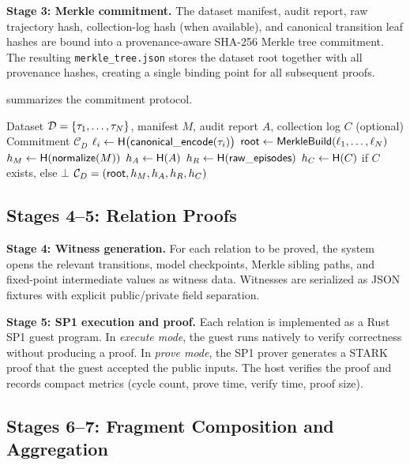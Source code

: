 \textbf{Stage 3: Merkle commitment.} The dataset manifest, audit report, raw
trajectory hash, collection-log hash (when available), and canonical transition
leaf hashes are bound into a provenance-aware SHA-256 Merkle tree commitment.
The resulting \texttt{merkle\_tree.json} stores the dataset root together with
all provenance hashes, creating a single binding point for all subsequent proofs.

 summarizes the commitment protocol.

\begin{algorithm}[!t]
\caption{Provenance-Bound Dataset Commitment}
\label{alg:dataset-commitment}
\begin{algorithmic}[1]
\Require Dataset $\mathcal{D} = \{\tau_1, \ldots, \tau_N\}$, manifest $M$,
  audit report $A$, collection log $C$ (optional)
\Ensure Commitment $\mathcal{C}_D$
  \State $\ell_i \gets \mathsf{H}\bigl(\mathsf{canonical\_encode}(\tau_i)\bigr)$
\EndFor
\State $\mathsf{root} \gets \mathsf{MerkleBuild}(\ell_1, \ldots, \ell_N)$
\State $h_M \gets \mathsf{H}(\mathsf{normalize}(M))$
\State $h_A \gets \mathsf{H}(A)$
\State $h_R \gets \mathsf{H}(\mathsf{raw\_episodes})$
\State $h_C \gets \mathsf{H}(C)$ if $C$ exists, else $\bot$
\State \Return $\mathcal{C}_D = (\mathsf{root}, h_M, h_A, h_R, h_C)$
\end{algorithmic}
\end{algorithm}

\subsection{Stages 4--5: Relation Proofs}

\textbf{Stage 4: Witness generation.} For each relation to be proved, the
system opens the relevant transitions, model checkpoints, Merkle sibling paths,
and fixed-point intermediate values as witness data. Witnesses are serialized as
JSON fixtures with explicit public/private field separation.

\textbf{Stage 5: SP1 execution and proof.} Each relation is implemented as a
Rust SP1 guest program. In \emph{execute mode}, the guest runs natively to
verify correctness without producing a proof. In \emph{prove mode}, the SP1
prover generates a STARK proof that the guest accepted the public inputs. The
host verifies the proof and records compact metrics (cycle count, prove time,
verify time, proof size).

\subsection{Stages 6--7: Fragment Composition and Aggregation}

